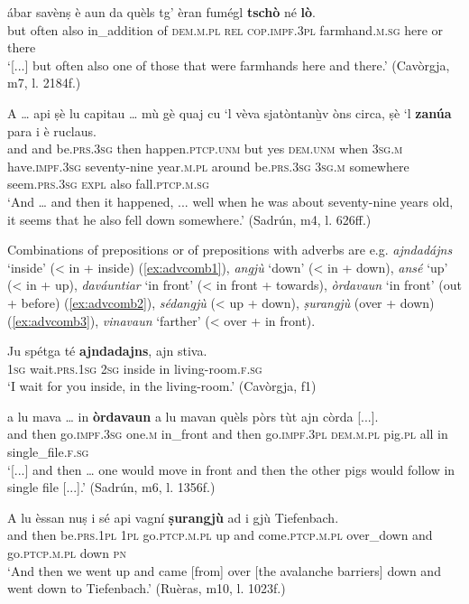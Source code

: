 \ea
\label{ex:tscholo}
\gll [...] ábar savènṣ è aun da quèls tg’ èran fumégl \textbf{tschò} né \textbf{lò}.\\
{} but often also in\_addition of \textsc{dem.m.pl} \textsc{rel} \textsc{cop.impf.3pl} farmhand.\textsc{m.sg} here or there\\
\glt `[...] but often also one of those that were farmhands here and there.' (Cavòrgja, m7, l. 2184f.)
\z

\ea
\label{ex:zan1}
\gll  A … api ṣè lu capitau … mù gè quaj cu `l vèva sjatòntanù̱v òns circa, ṣè `l \textbf{zanúa} para i è ruclaus.  \\
and {} and be.\textsc{prs.3sg} then happen.\textsc{ptcp.unm} {} but yes \textsc{dem.unm} when \textsc{3sg.m} have.\textsc{impf.3sg} seventy-nine year.\textsc{m.pl} around be.\textsc{prs.3sg} \textsc{3sg.m} somewhere  seem.\textsc{prs.3sg} \textsc{expl} also fall.\textsc{ptcp.m.sg}\\
\glt `And … and then it happened, ... well when he was about seventy-nine years old, it seems that he also fell down somewhere.' (Sadrún, m4, l. 626ff.)
\z

Combinations of prepositions or of prepositions with adverbs are e.g. \textit{ajndadájns} `inside' (< in + inside) (\ref{ex:advcomb1}), \textit{angjù} `down' (< in + down), \textit{ansé} `up' (< in + up), \textit{daváuntiar} `in front' (< in front + towards), \textit{òrdavaun} `in front' (out + before) (\ref{ex:advcomb2}), \textit{sédangjù} (< up + down), \textit{ṣurangjù} (over + down) (\ref{ex:advcomb3}), \textit{vinavaun} `farther' (< over + in front).

\ea
\label{ex:advcomb1}
\gll Ju spétga té \textbf{ajndadajns}, ajn stiva.\\
\textsc{1sg} wait\textsc{.prs.1sg} \textsc{2sg} inside in living-room.\textsc{f.sg}\\
\glt `I wait for you inside, in the living-room.' (Cavòrgja, f1)
\z

\ea
\label{ex:advcomb2}
\gll    [...] a lu mava … in \textbf{òrdavaun} a lu mavan quèls pòrs tùt ajn còrda [...].\\
{} and then go.\textsc{impf.3sg} {} one.\textsc{m} in\_front and then go.\textsc{impf.3pl} \textsc{dem.m.pl} pig.\textsc{pl} all in single\_file.\textsc{f.sg} \\
\glt `[...] and then … one would move in front and then the other pigs would follow in single file [...].' (Sadrún, m6, l. 1356f.)
\z

\ea
\label{ex:advcomb3}
\gll A lu èssan nuṣ i sé api vagní \textbf{ṣurangjù} ad i gjù Tiefenbach.\\
and then be.\textsc{prs.1pl} \textsc{1pl} go.\textsc{ptcp.m.pl} up and come.\textsc{ptcp.m.pl} over\_down and go.\textsc{ptcp.m.pl} down \textsc{pn}\\
\glt `And then we went up and came [from] over [the avalanche barriers] down and went down to Tiefenbach.' (Ruèras, m10, l. 1023f.)
\z

